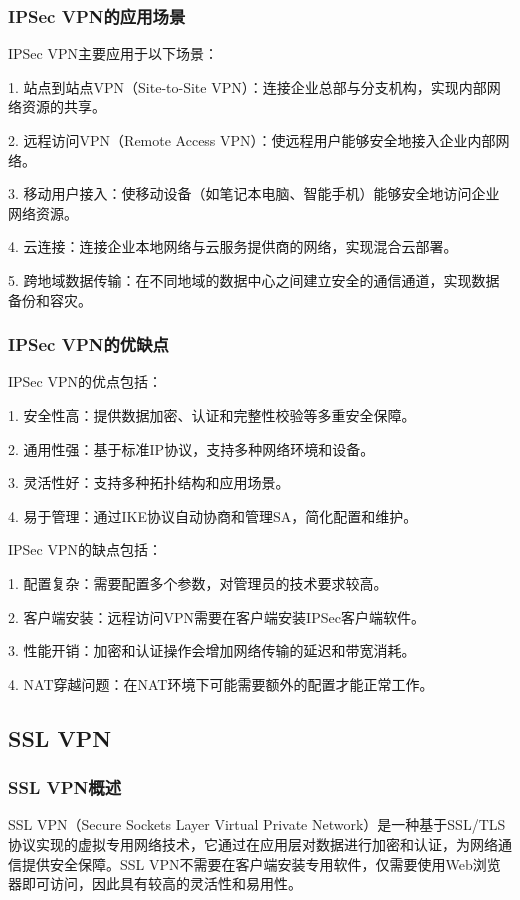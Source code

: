 \documentclass{book}
\begin{document}
\subsubsection{IPSec VPN的应用场景}

IPSec VPN主要应用于以下场景：

1. 站点到站点VPN（Site-to-Site VPN）：连接企业总部与分支机构，实现内部网络资源的共享。

2. 远程访问VPN（Remote Access VPN）：使远程用户能够安全地接入企业内部网络。

3. 移动用户接入：使移动设备（如笔记本电脑、智能手机）能够安全地访问企业网络资源。

4. 云连接：连接企业本地网络与云服务提供商的网络，实现混合云部署。

5. 跨地域数据传输：在不同地域的数据中心之间建立安全的通信通道，实现数据备份和容灾。

\subsubsection{IPSec VPN的优缺点}

IPSec VPN的优点包括：

1. 安全性高：提供数据加密、认证和完整性校验等多重安全保障。

2. 通用性强：基于标准IP协议，支持多种网络环境和设备。

3. 灵活性好：支持多种拓扑结构和应用场景。

4. 易于管理：通过IKE协议自动协商和管理SA，简化配置和维护。

IPSec VPN的缺点包括：

1. 配置复杂：需要配置多个参数，对管理员的技术要求较高。

2. 客户端安装：远程访问VPN需要在客户端安装IPSec客户端软件。

3. 性能开销：加密和认证操作会增加网络传输的延迟和带宽消耗。

4. NAT穿越问题：在NAT环境下可能需要额外的配置才能正常工作。

\subsection{SSL VPN}
\subsubsection{SSL VPN概述}
SSL VPN（Secure Sockets Layer Virtual Private Network）是一种基于SSL/TLS协议实现的虚拟专用网络技术，它通过在应用层对数据进行加密和认证，为网络通信提供安全保障。SSL VPN不需要在客户端安装专用软件，仅需要使用Web浏览器即可访问，因此具有较高的灵活性和易用性。
\end{document}
